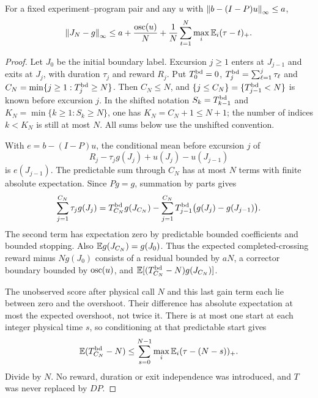 \begin{lemma}\label{lem:physical}
For a fixed experiment--program pair and any $u$ with $\left\lVert b-(I-P)u\right\rVert_\infty\le a$,
\[
 \left\lVert J_N-g\right\rVert_\infty
 \le a+\frac{\operatorname{osc}(u)}N+\frac1N\sum_{t=1}^N\max_i\mathbb E_i(\tau-t)_+.
\]
\end{lemma}
\begin{proof}
Let $J_0$ be the initial boundary label. Excursion $j\ge1$ enters at $J_{j-1}$ and exits at $J_j$, with duration $\tau_j$ and reward $R_j$. Put $T_0^{\rm bd}=0$, $T_j^{\rm bd}=\sum_{\ell=1}^j\tau_\ell$ and $C_N=\min\{j\ge1:T_j^{\rm bd}\ge N\}$. Then $C_N\le N$, and $\{j\le C_N\}=\{T_{j-1}^{\rm bd}<N\}$ is known before excursion $j$. In the shifted notation $S_k=T_{k-1}^{\rm bd}$ and $K_N=\min\{k\ge1:S_k\ge N\}$, one has $K_N=C_N+1\le N+1$; the number of indices $k<K_N$ is still at most $N$. All sums below use the unshifted convention.

With $e=b-(I-P)u$, the conditional mean before excursion $j$ of
\[
 R_j-\tau_jg(J_j)+u(J_j)-u(J_{j-1})
\]
is $e(J_{j-1})$. The predictable sum through $C_N$ has at most $N$ terms with finite absolute expectation. Since $Pg=g$, summation by parts gives
\[
 \sum_{j=1}^{C_N}\tau_jg(J_j)
 =T_{C_N}^{\rm bd}g(J_{C_N})-
 \sum_{j=1}^{C_N}T_{j-1}^{\rm bd}\bigl(g(J_j)-g(J_{j-1})\bigr).
\]
The second term has expectation zero by predictable bounded coefficients and bounded stopping. Also $\mathbb E g(J_{C_N})=g(J_0)$. Thus the expected completed-crossing reward minus $Ng(J_0)$ consists of a residual bounded by $aN$, a corrector boundary bounded by $\operatorname{osc}(u)$, and $\mathbb E[(T_{C_N}^{\rm bd}-N)g(J_{C_N})]$.

The unobserved score after physical call $N$ and this last gain term each lie between zero and the overshoot. Their difference has absolute expectation at most the expected overshoot, not twice it. There is at most one start at each integer physical time $s$, so conditioning at that predictable start gives
\[
 \mathbb E(T_{C_N}^{\rm bd}-N)\le
 \sum_{s=0}^{N-1}\max_i\mathbb E_i(\tau-(N-s))_+.
\]
Divide by $N$. No reward, duration or exit independence was introduced, and $T$ was never replaced by $DP$.
\end{proof}

